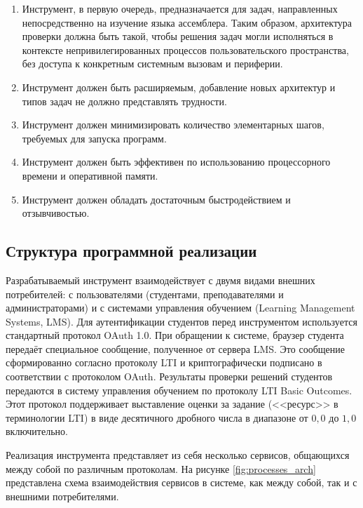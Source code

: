 \documentclass[a4paper,article,14pt]{extarticle}
\begin{document}
\begin{enumerate}
    \item Инструмент, в первую очередь, предназначается для задач, направленных непосредственно на изучение языка ассемблера. Таким образом, архитектура проверки должна быть такой, чтобы решения задач могли исполняться в контексте непривилегированных процессов пользовательского пространства, без доступа к конкретным системным вызовам и периферии.
    \item Инструмент должен быть расширяемым, добавление новых архитектур и типов задач не должно представлять трудности.
    \item Инструмент должен минимизировать количество элементарных шагов, требуемых для запуска программ.
    \item Инструмент должен быть эффективен по использованию процессорного времени и оперативной памяти.
    \item Инструмент должен обладать достаточным быстродействием и отзывчивостью.
\end{enumerate}

\subsection{Структура программной реализации}

Разрабатываемый инструмент взаимодействует с двумя видами внешних потребителей: с пользователями (студентами, преподавателями и администраторами) и с системами управления обучением (Learning Management Systems, LMS). Для аутентификации студентов перед инструментом используется стандартный протокол OAuth 1.0\cite{oauthrfc}. При обращении к системе, браузер студента передаёт специальное сообщение, полученное от сервера LMS. Это сообщение сформированно согласно протоколу LTI\cite{lti} и криптографически подписано в соответствии с протоколом OAuth. Результаты проверки решений студентов передаются в систему управления обучением по протоколу LTI Basic Outcomes\cite{ltioutcomes}. Этот протокол поддерживает выставление оценки за задание (<<ресурс>> в терминологии LTI) в виде десятичного дробного числа в диапазоне от $0{,}0$ до $1{,}0$ включительно.

Реализация инструмента представляет из себя несколько сервисов, общающихся между собой по различным протоколам. На рисунке \ref{fig:processes_arch} представлена схема взаимодействия сервисов в системе, как между собой, так и с внешними потребителями.
\end{document}
